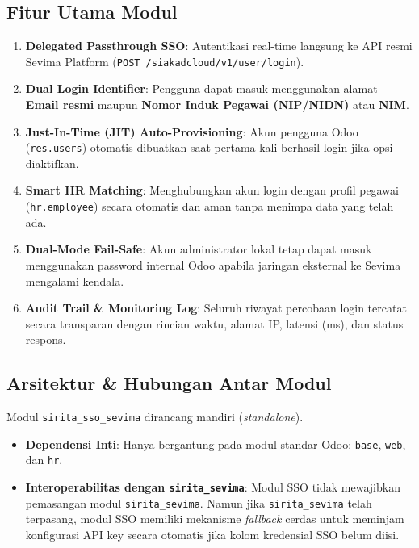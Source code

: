 \documentclass[11pt,a4paper]{article}
\begin{document}
\subsection{Fitur Utama Modul}
\begin{enumerate}[label=\textbf{\arabic*.}]
    \item \textbf{Delegated Passthrough SSO}: Autentikasi real-time langsung ke API resmi Sevima Platform (\texttt{POST /siakadcloud/v1/user/login}).
    \item \textbf{Dual Login Identifier}: Pengguna dapat masuk menggunakan alamat \textbf{Email resmi} maupun \textbf{Nomor Induk Pegawai (NIP/NIDN)} atau \textbf{NIM}.
    \item \textbf{Just-In-Time (JIT) Auto-Provisioning}: Akun pengguna Odoo (\texttt{res.users}) otomatis dibuatkan saat pertama kali berhasil login jika opsi diaktifkan.
    \item \textbf{Smart HR Matching}: Menghubungkan akun login dengan profil pegawai (\texttt{hr.employee}) secara otomatis dan aman tanpa menimpa data yang telah ada.
    \item \textbf{Dual-Mode Fail-Safe}: Akun administrator lokal tetap dapat masuk menggunakan password internal Odoo apabila jaringan eksternal ke Sevima mengalami kendala.
    \item \textbf{Audit Trail \& Monitoring Log}: Seluruh riwayat percobaan login tercatat secara transparan dengan rincian waktu, alamat IP, latensi (ms), dan status respons.
\end{enumerate}

\subsection{Arsitektur \& Hubungan Antar Modul}
Modul \texttt{sirita\_sso\_sevima} dirancang mandiri (\textit{standalone}).
\begin{itemize}
    \item \textbf{Dependensi Inti}: Hanya bergantung pada modul standar Odoo: \texttt{base}, \texttt{web}, dan \texttt{hr}.
    \item \textbf{Interoperabilitas dengan \texttt{sirita\_sevima}}: Modul SSO tidak mewajibkan pemasangan modul \texttt{sirita\_sevima}. Namun jika \texttt{sirita\_sevima} telah terpasang, modul SSO memiliki mekanisme \textit{fallback} cerdas untuk meminjam konfigurasi API key secara otomatis jika kolom kredensial SSO belum diisi.
\end{itemize}

\newpage
\end{document}

